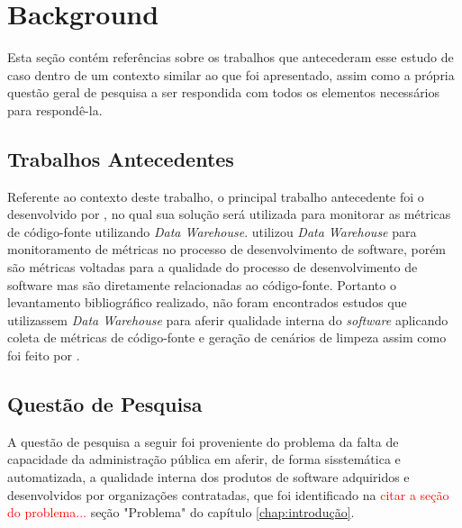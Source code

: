 \section{Background}\label{sec:Background}

Esta seção contém referências sobre os trabalhos que antecederam esse estudo de caso dentro de um contexto similar ao que foi apresentado, assim como a própria questão geral de pesquisa a ser respondida com todos os elementos necessários para respondê-la.

\subsection{Trabalhos Antecedentes}

Referente ao contexto deste trabalho, o principal trabalho antecedente foi o desenvolvido por , no qual sua solução será utilizada para monitorar as métricas de código-fonte utilizando \textit{Data Warehouse}.
 utilizou \textit{Data Warehouse} para monitoramento de métricas no processo de desenvolvimento de software, porém são métricas voltadas para a qualidade do processo de desenvolvimento de software mas são diretamente relacionadas ao código-fonte. Portanto o levantamento bibliográfico realizado, não foram encontrados estudos que utilizassem \textit{Data Warehouse} para aferir qualidade interna do \textit{software }aplicando coleta de métricas de código-fonte e geração de cenários de limpeza assim como foi feito por .

\textcolor{red}{}


\subsection{Questão de Pesquisa}

A questão de pesquisa a seguir foi proveniente do problema da falta de capacidade da administração pública em aferir, de forma sisstemática e automatizada, a qualidade interna dos produtos de software adquiridos e desenvolvidos por organizações contratadas, que foi identificado na \textcolor{red}{citar a seção do problema... }seção "Problema" do capítulo \ref{chap:introdução}. 

